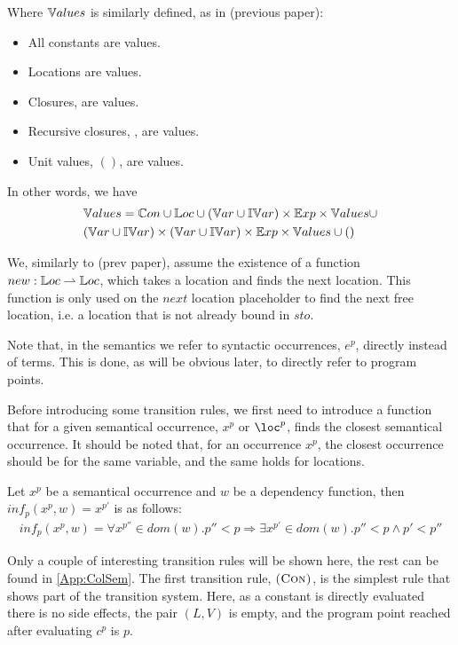 \documentclass[../../master.tex]{subfiles}
\begin{document}
Where $\mathbb{V}alues$ is similarly defined, as in (previous paper):
\begin{itemize}
	\item All constants are values.
	\item Locations are values.
	\item Closures,  are values.
	\item Recursive closures, , are values.
	\item Unit values, $()$, are values.
\end{itemize}
In other words, we have
\begin{align*}
	&\mathbb{V}alues=\mathbb{C}on\cup\mathbb{L}oc\cup(\mathbb{V}ar\cup\mathbb{IV}ar)\times\mathbb{E}xp\times\mathbb{V}alues\cup\\
	&(\mathbb{V}ar\cup\mathbb{IV}ar)\times(\mathbb{V}ar\cup\mathbb{IV}ar)\times\mathbb{E}xp\times\mathbb{V}alues\cup()
\end{align*}

We, similarly to (prev paper), assume the existence of a function $new:\mathbb{L}oc\rightharpoonup\mathbb{L}oc$, which takes a location and finds the next location.
This function is only used on the $next$ location placeholder to find the next free location, i.e. a location that is not already bound in $sto$.

Note that, in the semantics we refer to syntactic occurrences, $e^p$, directly instead of terms.
This is done, as will be obvious later, to directly refer to program points.

Before introducing some transition rules, we first need to introduce a function that for a given semantical occurrence, $x^p$ or $\loc^p$, finds the closest semantical occurrence.
It should be noted that, for an occurrence $x^p$, the closest occurrence should be for the same variable, and the same holds for locations.

\begin{definition}
	Let $x^p$ be a semantical occurrence and $w$ be a dependency function, then $inf_p(x^p,w)=x^{p'}$ is as follows:
	\begin{align*}
		inf_p(x^p,w)=\forall x^{p''}\in dom(w). p''<p\Rightarrow \exists x^{p'}\in dom(w).p''<p\wedge p'<p''
	\end{align*}
\end{definition}
\bigskip

Only a couple of interesting transition rules will be shown here, the rest can be found in \cref{App:ColSem}.
The first transition rule, $\textsc{(Con)}$, is the simplest rule that shows part of the transition system.
Here, as a constant is directly evaluated there is no side effects, the pair $(L,V)$ is empty, and the program point reached after evaluating $c^p$ is $p$.
\end{document}
